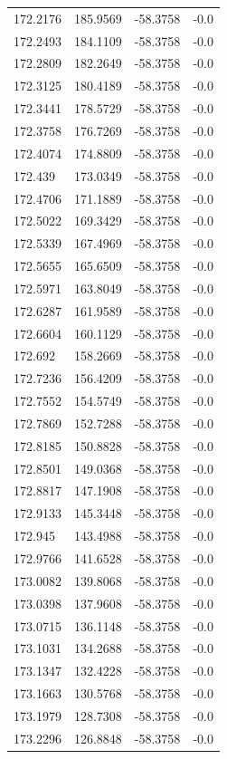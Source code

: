 \begin{table}[H]
\begin{tabular}{llll}
172.2176 & 185.9569 & -58.3758 & -0.0 \\
172.2493 & 184.1109 & -58.3758 & -0.0 \\
172.2809 & 182.2649 & -58.3758 & -0.0 \\
172.3125 & 180.4189 & -58.3758 & -0.0 \\
172.3441 & 178.5729 & -58.3758 & -0.0 \\
172.3758 & 176.7269 & -58.3758 & -0.0 \\
172.4074 & 174.8809 & -58.3758 & -0.0 \\
172.439 & 173.0349 & -58.3758 & -0.0 \\
172.4706 & 171.1889 & -58.3758 & -0.0 \\
172.5022 & 169.3429 & -58.3758 & -0.0 \\
172.5339 & 167.4969 & -58.3758 & -0.0 \\
172.5655 & 165.6509 & -58.3758 & -0.0 \\
172.5971 & 163.8049 & -58.3758 & -0.0 \\
172.6287 & 161.9589 & -58.3758 & -0.0 \\
172.6604 & 160.1129 & -58.3758 & -0.0 \\
172.692 & 158.2669 & -58.3758 & -0.0 \\
172.7236 & 156.4209 & -58.3758 & -0.0 \\
172.7552 & 154.5749 & -58.3758 & -0.0 \\
172.7869 & 152.7288 & -58.3758 & -0.0 \\
172.8185 & 150.8828 & -58.3758 & -0.0 \\
172.8501 & 149.0368 & -58.3758 & -0.0 \\
172.8817 & 147.1908 & -58.3758 & -0.0 \\
172.9133 & 145.3448 & -58.3758 & -0.0 \\
172.945 & 143.4988 & -58.3758 & -0.0 \\
172.9766 & 141.6528 & -58.3758 & -0.0 \\
173.0082 & 139.8068 & -58.3758 & -0.0 \\
173.0398 & 137.9608 & -58.3758 & -0.0 \\
173.0715 & 136.1148 & -58.3758 & -0.0 \\
173.1031 & 134.2688 & -58.3758 & -0.0 \\
173.1347 & 132.4228 & -58.3758 & -0.0 \\
173.1663 & 130.5768 & -58.3758 & -0.0 \\
173.1979 & 128.7308 & -58.3758 & -0.0 \\
173.2296 & 126.8848 & -58.3758 & -0.0 \\

\end{tabular}
\end{table}
